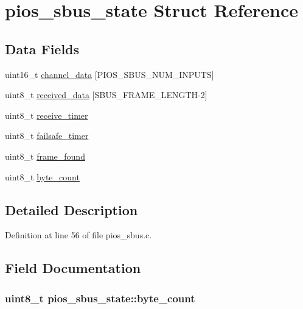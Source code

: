\hypertarget{structpios__sbus__state}{\section{pios\-\_\-sbus\-\_\-state \-Struct \-Reference}
\label{structpios__sbus__state}
}
\subsection*{\-Data \-Fields}
\begin{DoxyCompactItemize}
\item 
uint16\-\_\-t \hyperlink{structpios__sbus__state_ac6e4db09887aa141183e800d990ad794}{channel\-\_\-data} \mbox{[}\-P\-I\-O\-S\-\_\-\-S\-B\-U\-S\-\_\-\-N\-U\-M\-\_\-\-I\-N\-P\-U\-T\-S\mbox{]}
\item 
uint8\-\_\-t \hyperlink{structpios__sbus__state_a83bb02cd783bb2f8d8aabf3b94e9324b}{received\-\_\-data} \mbox{[}\-S\-B\-U\-S\-\_\-\-F\-R\-A\-M\-E\-\_\-\-L\-E\-N\-G\-T\-H-\/2\mbox{]}
\item 
uint8\-\_\-t \hyperlink{structpios__sbus__state_a064c8174115b5d3e710a97e8a0df781f}{receive\-\_\-timer}
\item 
uint8\-\_\-t \hyperlink{structpios__sbus__state_a5238707dcd8e68afb924becd99a5ea83}{failsafe\-\_\-timer}
\item 
uint8\-\_\-t \hyperlink{structpios__sbus__state_a44f2ee1a5d510745a695cd8a38324559}{frame\-\_\-found}
\item 
uint8\-\_\-t \hyperlink{structpios__sbus__state_aa6babeae323fa32b273fff516cdc4c1d}{byte\-\_\-count}
\end{DoxyCompactItemize}


\subsection{\-Detailed \-Description}


\-Definition at line 56 of file pios\-\_\-sbus.\-c.



\subsection{\-Field \-Documentation}
\hypertarget{structpios__sbus__state_aa6babeae323fa32b273fff516cdc4c1d}{
\subsubsection[{byte\-\_\-count}]{\setlength{\rightskip}{0pt plus 5cm}uint8\-\_\-t {\bf pios\-\_\-sbus\-\_\-state\-::byte\-\_\-count}}}\label{structpios__sbus__state_aa6babeae323fa32b273fff516cdc4c1d}


